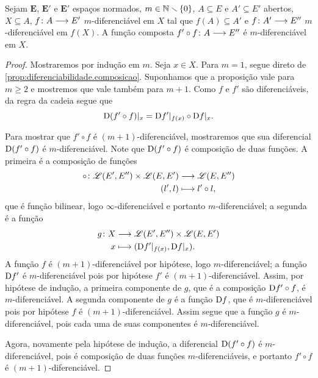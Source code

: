 \begin{proposition}
\label{prop:multidiferenciabilidade.composicao}
Sejam $\bm E$, $\bm E'$ e $\bm E'$ espaços normados, $m \in \mathbb{N} \smallsetminus \{0\}$, $A \subseteq E$ e $A' \subseteq E'$ abertos, $X \subseteq A$, ${f}\colon {A} \longrightarrow {E'}$ $m$-diferenciável em $X$ tal que $f(A) \subseteq A'$ e ${f}\colon {A'} \longrightarrow {E''}$ $m$-diferenciável em $f(X)$. A função composta ${f' \circ f}\colon {A} \longrightarrow {E''}$ é $m$-diferenciável em $X$.%
\end{proposition}
\begin{proof}
Mostraremos por indução em $m$. Seja $x \in X$. Para $m=1$, segue direto de \ref{prop:diferenciabilidade.composicao}. Suponhamos que a proposição vale para $m \geq 2$ e mostremos que vale também para $m+1$. Como $f$ e $f'$ são diferenciáveis, da regra da cadeia segue que
	\begin{equation*}
	\mathrm{D}(f' \circ f)|_x = \mathrm{D} f'|_{f(x)} \circ \mathrm{D} f|_x.
	\end{equation*}

Para mostrar que $f' \circ f$ é $(m+1)$-diferenciável, mostraremos que sua diferencial $\mathrm{D}(f' \circ f)$ é $m$-diferenciável. Note que $\mathrm{D}(f' \circ f)$ é composição de duas funções. A primeira é a composição de funções
	\begin{align*}
	{\circ}\colon {\mathscr{L}(E',E'') \times \mathscr{L}(E,E')} &\longrightarrow {\mathscr{L}(E,E'')} \\{(l',l)} &\longmapsto l' \circ l,
	\end{align*}
que é função bilinear, logo $\infty$-diferenciável e portanto $m$-diferenciável; a segunda é a função
	\begin{align*}
	{g}\colon {X} &\longrightarrow {\mathscr{L}(E',E'') \times \mathscr{L}(E,E')} \\{x} &\longmapsto (\mathrm{D} f'|_{f(x)}, \mathrm{D} f|_x).
	\end{align*}
A função $f$ é $(m+1)$-diferenciável por hipótese, logo $m$-diferenciável; a função $\mathrm{D} f'$ é $m$-diferenciável pois por hipótese $f'$ é $(m+1)$-diferenciável. Assim, por hipótese de indução, a primeira componente de $g$, que é a composição $\mathrm{D} f' \circ f$, é $m$-diferenciável. A segunda componente de $g$ é a função $\mathrm{D} f$, que é $m$-diferenciável pois por hipótese $f$ é $(m+1)$-diferenciável. Assim segue que a função $g$ é $m$-diferenciável, pois cada uma de suas componentes é $m$-diferenciável.

Agora, novamente pela hipótese de indução, a diferencial $\mathrm{D}(f' \circ f)$ é $m$-diferenciável, pois é composição de duas funções $m$-diferenciáveis, e portanto $f' \circ f$ é $(m+1)$-diferenciável.
\end{proof}

